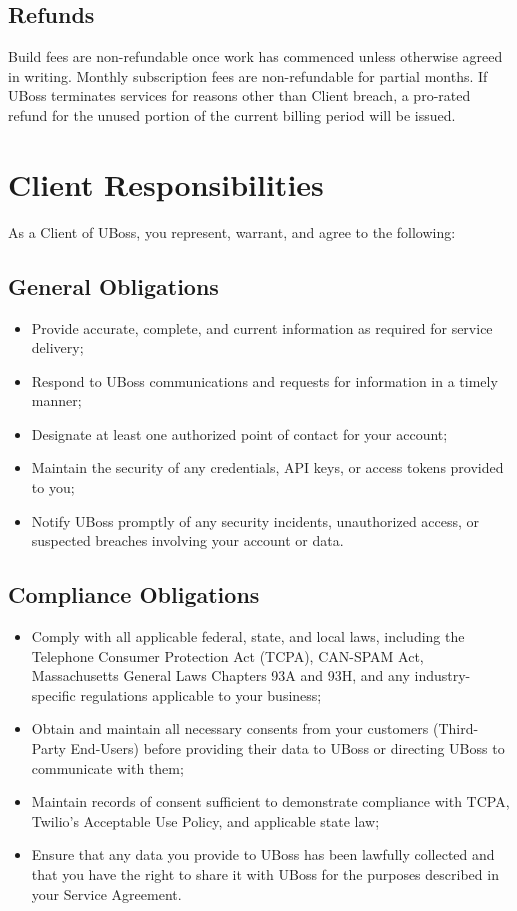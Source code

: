 \documentclass[11pt,letterpaper,parskip=half]{scrartcl}
\begin{document}
\subsection{Refunds}

Build fees are non-refundable once work has commenced unless otherwise agreed in writing. Monthly subscription fees are non-refundable for partial months. If UBoss terminates services for reasons other than Client breach, a pro-rated refund for the unused portion of the current billing period will be issued.

\section{Client Responsibilities}

As a Client of UBoss, you represent, warrant, and agree to the following:

\subsection{General Obligations}

\begin{itemize}[nosep, leftmargin=1.5em]
    \item Provide accurate, complete, and current information as required for service delivery;
    \item Respond to UBoss communications and requests for information in a timely manner;
    \item Designate at least one authorized point of contact for your account;
    \item Maintain the security of any credentials, API keys, or access tokens provided to you;
    \item Notify UBoss promptly of any security incidents, unauthorized access, or suspected breaches involving your account or data.
\end{itemize}

\subsection{Compliance Obligations}

\begin{itemize}[nosep, leftmargin=1.5em]
    \item Comply with all applicable federal, state, and local laws, including the Telephone Consumer Protection Act (TCPA), CAN-SPAM Act, Massachusetts General Laws Chapters 93A and 93H, and any industry-specific regulations applicable to your business;
    \item Obtain and maintain all necessary consents from your customers (Third-Party End-Users) before providing their data to UBoss or directing UBoss to communicate with them;
    \item Maintain records of consent sufficient to demonstrate compliance with TCPA, Twilio's Acceptable Use Policy, and applicable state law;
    \item Ensure that any data you provide to UBoss has been lawfully collected and that you have the right to share it with UBoss for the purposes described in your Service Agreement.
\end{itemize}
\end{document}
